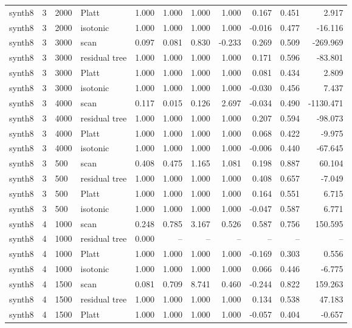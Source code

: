 \begin{tabular}{lrllrrrrrrr}
synth8 & 3 & 2000 & Platt & 1.000 & 1.000 & 1.000 & 1.000 & 0.167 & 0.451 & 2.917 \\
synth8 & 3 & 2000 & isotonic & 1.000 & 1.000 & 1.000 & 1.000 & -0.016 & 0.477 & -16.116 \\
synth8 & 3 & 3000 & scan & 0.097 & 0.081 & 0.830 & -0.233 & 0.269 & 0.509 & -269.969 \\
synth8 & 3 & 3000 & residual tree & 1.000 & 1.000 & 1.000 & 1.000 & 0.171 & 0.596 & -83.801 \\
synth8 & 3 & 3000 & Platt & 1.000 & 1.000 & 1.000 & 1.000 & 0.081 & 0.434 & 2.809 \\
synth8 & 3 & 3000 & isotonic & 1.000 & 1.000 & 1.000 & 1.000 & -0.030 & 0.456 & 7.437 \\
synth8 & 3 & 4000 & scan & 0.117 & 0.015 & 0.126 & 2.697 & -0.034 & 0.490 & -1130.471 \\
synth8 & 3 & 4000 & residual tree & 1.000 & 1.000 & 1.000 & 1.000 & 0.207 & 0.594 & -98.073 \\
synth8 & 3 & 4000 & Platt & 1.000 & 1.000 & 1.000 & 1.000 & 0.068 & 0.422 & -9.975 \\
synth8 & 3 & 4000 & isotonic & 1.000 & 1.000 & 1.000 & 1.000 & -0.006 & 0.440 & -67.645 \\
synth8 & 3 & 500 & scan & 0.408 & 0.475 & 1.165 & 1.081 & 0.198 & 0.887 & 60.104 \\
synth8 & 3 & 500 & residual tree & 1.000 & 1.000 & 1.000 & 1.000 & 0.408 & 0.657 & -7.049 \\
synth8 & 3 & 500 & Platt & 1.000 & 1.000 & 1.000 & 1.000 & 0.164 & 0.551 & 6.715 \\
synth8 & 3 & 500 & isotonic & 1.000 & 1.000 & 1.000 & 1.000 & -0.047 & 0.587 & 6.771 \\
synth8 & 4 & 1000 & scan & 0.248 & 0.785 & 3.167 & 0.526 & 0.587 & 0.756 & 150.595 \\
synth8 & 4 & 1000 & residual tree & 0.000 & -- & -- & -- & -- & -- & -- \\
synth8 & 4 & 1000 & Platt & 1.000 & 1.000 & 1.000 & 1.000 & -0.169 & 0.303 & 0.556 \\
synth8 & 4 & 1000 & isotonic & 1.000 & 1.000 & 1.000 & 1.000 & 0.066 & 0.446 & -6.775 \\
synth8 & 4 & 1500 & scan & 0.081 & 0.709 & 8.741 & 0.460 & -0.244 & 0.822 & 159.263 \\
synth8 & 4 & 1500 & residual tree & 1.000 & 1.000 & 1.000 & 1.000 & 0.134 & 0.538 & 47.183 \\
synth8 & 4 & 1500 & Platt & 1.000 & 1.000 & 1.000 & 1.000 & -0.057 & 0.404 & -0.657 \\

\end{tabular}
